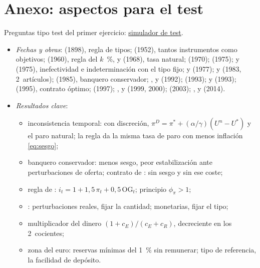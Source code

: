 \documentclass[11pt]{article}
\begin{document}
\section{Anexo: aspectos para el test}\label{anexo:test}

\begin{anotaciones}
Preguntas tipo test del primer ejercicio: \href{https://www.victorgutierrezmarcos.es/oposicion/temario/primer-ejercicio/test/simulador.html?tema=3.A.36}{simulador de test}.
\end{anotaciones}

\begin{itemize}
\item \emph{Fechas y obras}:  (1898), regla de tipos;  (1952), tantos instrumentos como objetivos;  (1960), regla del $k$~\%, y (1968), tasa natural;  (1970);  (1975);  y  (1975), inefectividad e indeterminación con el tipo fijo;  y  (1977);  y  (1983, 2~artículos);  (1985), banquero conservador; ,  y  (1992);  (1993);  y  (1993);  (1995), contrato óptimo;  (1997); ,  y  (1999, 2000);  (2003); ,  y  (2014).
\item \emph{Resultados clave}:
  \begin{itemize}
  \item inconsistencia temporal: con discreción, $\pi^D=\pi^*+(\alpha/\gamma)(U^n-U^*)$ y el paro natural; la regla da la misma tasa de paro con menos inflación \eqref{eq:sesgo};
  \item banquero conservador: menos sesgo, peor estabilización ante perturbaciones de oferta; contrato de : sin sesgo y sin ese coste;
  \item regla de : $i_t=1+1{,}5\,\pi_t+0{,}5\,\mathrm{OG}_t$; principio $\phi_\pi>1$;
  \item {}: perturbaciones reales, fijar la cantidad; monetarias, fijar el tipo;
  \item multiplicador del dinero $(1+c_E)/(c_E+c_R)$, decreciente en los 2~cocientes;
  \item zona del euro: reservas mínimas del 1~\% sin remunerar; tipo de referencia, la facilidad de depósito.
  \end{itemize}
\end{itemize}

\bibliografia
\end{document}
